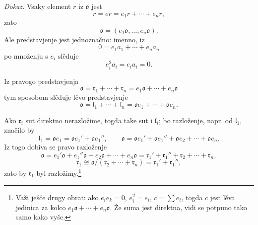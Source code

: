 \documentclass[11pt]{article}
\providecommand{\ml}{\mathfrak{l}}
\providecommand{\mo}{\mathfrak{o}}
\providecommand{\mr}{\mathfrak{r}}
\begin{document}
\emph{Dokaz.} Vsaky element $r$ iz $\mo$ jest
\[
        r=er=e_1r+\cdots+e_nr,
\]
zato
\[
        \mo=(e_1\mo,\ldots,e_n\mo).
\]
Ale predstavjenje jest jednoznačno: imenno, iz
\[
        0=e_1a_1+\cdots+e_na_n
\]
po množenju s $e_i$ slěduje
\[
        e_i^2a_i=e_i a_i=0.
\]

Iz pravogo predstavjenja
\[
        \mo=\mr_1+\cdots+\mr_n=e_1\mo+\cdots+e_n\mo
\]
tym sposobom slěduje lěvo predstavjenje
\[
        \mo=\ml_1+\cdots+\ml_n=\mo e_1+\cdots+\mo e_n.
\]

Ako $\mr_i$ sut direktno nerazložime, togda take sut i $\ml_i$; bo razloženje, napr. od $\ml_1$, značilo by
\[
        \ml_1=\mo e_1=\mo e_1'+\mo e_1'',
        \qquad
        \mo=\mo e_1'+\mo e_1''+\mo e_2+\cdots+\mo e_n.
\]
Iz togo dobiva se pravo razloženje
\[
        \mo=e_1'\mo+e_1''\mo+e_2\mo+\cdots+e_n\mo
        =\mr_1'+\mr_1''+\mr_2+\cdots+\mr_n,
\]
\[
        \mr_1\cong \mo/(\mr_2+\cdots+\mr_n)=\mr_1'+\mr_1'',
\]
zato by $\mr_1$ byl razložimy.\footnote{Važi ješče drugy obrat: ako $e_i e_k=0$, $e_i^2=e_i$, $c=\sum e_i$, togda $c$ jest lěva jedinica za kolco $e_1\mo+\cdots+e_n\mo$. Že suma jest direktna, vidi se potpuno tako samo kako vyše.}
\end{document}

